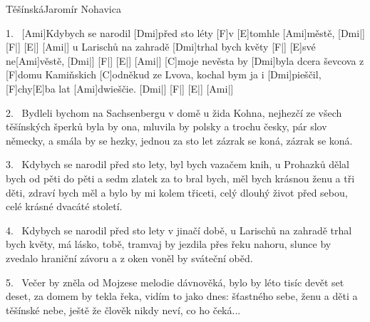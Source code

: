 \begin{song}{Těšínská}{Jaromír Nohavica}

\begin{xverse}{1.~}
[\large Ami]Kdybych se narodil [\large Dmi]před sto léty [\large F]v [\large E]tomhle [\large Ami]městě, [\large Dmi|]{} [\large F|]{} [\large E|]{} [\large Ami|]{}
u Larischů na zahradě [\large Dmi]trhal bych květy [\large F|{}] [\large E]své ne[\large Ami]věstě, [\large Dmi|]{} [\large F|]{} [\large E|]{} [\large Ami|]{}
[\large C]moje nevěsta by [\large Dmi]byla dcera ševcova
z [\large F]domu Kamiňskich [\large C]odněkud ze Lvova,
kochal bym ja i [\large Dmi]pieščil, [\large F]chy[\large E]ba lat [\large Ami]dwieščie. [\large Dmi|]{} [\large F|]{} [\large E|]{} [\large Ami|]{}
\end{xverse}

\begin{xverse}{2.~}
Bydleli bychom na Sachsenbergu v domě u žida Kohna,
nejhezčí ze všech těšínských šperků byla by ona,
mluvila by polsky a trochu česky,
pár slov německy, a smála by se hezky,
jednou za sto let zázrak se koná, zázrak se koná.
\end{xverse}

\begin{xverse}{3.~}
Kdybych se narodil před sto lety, byl bych vazačem knih,
u Prohazků dělal bych od pěti do pěti a sedm zlatek za to bral bych,
měl bych krásnou ženu a tři děti,
zdraví bych měl a bylo by mi kolem třiceti,
celý dlouhý život před sebou, celé krásné dvacáté století.
\end{xverse}

\begin{xverse}{4.~}
Kdybych se narodil před sto lety v jinačí době,
u Larischů na zahradě trhal bych květy, má lásko, tobě,
tramvaj by jezdila přes řeku nahoru,
slunce by zvedalo hraniční závoru
a z oken voněl by sváteční oběd.
\end{xverse}

\begin{xverse}{5.~}
Večer by zněla od Mojzese melodie dávnověká,
bylo by léto tisíc devět set deset, za domem by tekla řeka,
vidím to jako dnes: šťastného sebe,
ženu a děti a těšínské nebe,
ještě že člověk nikdy neví, co ho čeká...
\end{xverse}

\end{song}




